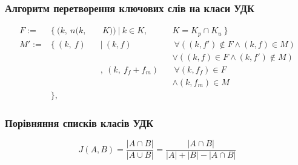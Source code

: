 \documentclass{beamer}
\begin{document}
\begin{frame}
	\frametitle{Алгоритм перетворення ключових слів на класи УДК}
	\begin{equation}
    \begin{alignedat}{3}
      F := &\{~ (k,~ n(k,&&~ K)) ~|~ k \in K,~ &&K = K_p \cap K_u ~\} \\
      M':= &\{~ (k,~ f)  &&|~ (k, f)          &&~\forall ((k, f') \notin F
           \land   (k, f) \in M) \\
           &             &&                    &&\lor   ((k, f) \in F
           \land   (k, f') \notin M) \\
           &             &&,~ (k,~ f_f + f_m) &&~\forall (k, f_f) \in F \\
           &             &&                    &&\land   (k, f_m) \in M \\
           &\},
    \end{alignedat}
	\nonumber
\end{equation}
\end{frame}

\begin{frame}
	\frametitle{Порівняння списків класів УДК}
	\begin{equation}
    J(A, B) =  \frac{| A \cap B |}{ | A \cup B | }
    = \frac{| A \cap B | }{  |A| + |B| - | A \cap B | }
	\nonumber
\end{equation}
\end{frame}
\end{document}
